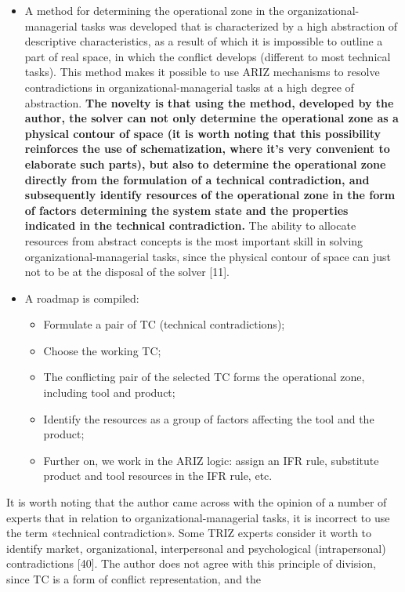 \documentclass[11pt,a4paper]{book}
\begin{document}
\begin{itemize}
\item A method for determining the operational zone in the
  organizational-managerial tasks was developed that is characterized by a
  high abstraction of descriptive characteristics, as a result of which it is
  impossible to outline a part of real space, in which the conflict develops
  (different to most technical tasks).  This method makes it possible to use
  ARIZ mechanisms to resolve contradictions in organizational-managerial tasks
  at a high degree of abstraction. \textbf{The novelty is that using the
    method, developed by the author, the solver can not only determine the
    operational zone as a physical contour of space (it is worth noting that
    this possibility reinforces the use of schematization, where it’s very
    convenient to elaborate such parts), but also to determine the operational
    zone directly from the formulation of a technical contradiction, and
    subsequently identify resources of the operational zone in the form of
    factors determining the system state and the properties indicated in the
    technical contradiction.} The ability to allocate resources from abstract
  concepts is the most important skill in solving organizational-managerial
  tasks, since the physical contour of space can just not to be at the
  disposal of the solver [11].
\item A roadmap is compiled:
  \begin{itemize}
  \item Formulate a pair of TC (technical contradictions);
  \item Choose the working TC;
  \item The conflicting pair of the selected TC forms the operational zone,
    including tool and product;
  \item Identify the resources as a group of factors affecting the tool and
    the product;
  \item Further on, we work in the ARIZ logic: assign an IFR rule, substitute
    product and tool resources in the IFR rule, etc.
  \end{itemize}
\end{itemize}
It is worth noting that the author came across with the opinion of a number of
experts that in relation to organizational-managerial tasks, it is incorrect
to use the term «technical contradiction». Some TRIZ experts consider it worth
to identify market, organizational, interpersonal and psychological
(intrapersonal) contradictions [40]. The author does not agree with this
principle of division, since TC is a form of conflict representation, and the
\end{document}
